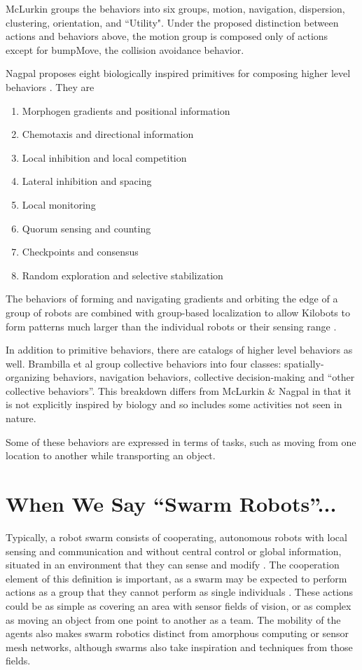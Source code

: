 \documentclass[]{article}
\begin{document}
McLurkin groups the behaviors into six groups, motion, navigation, dispersion, clustering, orientation, and ``Utility". Under the proposed distinction between actions and behaviors above, the motion group is composed only of actions except for bumpMove, the collision avoidance behavior. 

Nagpal proposes eight biologically inspired primitives for composing higher level behaviors \cite{nagpal2004catalog}. They are 
\begin{enumerate}
\item Morphogen gradients and positional information
\item Chemotaxis and directional information
\item Local inhibition and local competition
\item Lateral inhibition and spacing
\item Local monitoring
\item Quorum sensing and counting
\item Checkpoints and consensus
\item Random exploration and selective stabilization
\end{enumerate}

The behaviors of forming and navigating gradients and orbiting the edge of a group of robots are combined with group-based localization to allow Kilobots to form patterns much larger than the individual robots or their sensing range \cite{Rubenstein795}. 


In addition to primitive behaviors, there are catalogs of higher level behaviors as well. 
Brambilla et al group collective behaviors into four classes: spatially-organizing behaviors, navigation behaviors, collective decision-making and ``other collective behaviors''.
This breakdown differs from McLurkin \& Nagpal in that it is not explicitly inspired by biology and so includes some activities not seen in nature. 

Some of these behaviors are expressed in terms of tasks, such as moving from one location to another while transporting an object. 

\section{When We Say ``Swarm Robots''...}

Typically, a robot swarm consists of cooperating, autonomous robots with local sensing and communication and without central control or global information, situated in an environment that they can sense and modify \cite{brambilla2013swarm}.
The cooperation element of this definition is important, as a swarm may be expected to perform actions as a group that they cannot perform as single individuals \cite{csahin2004swarm}. 
These actions could be as simple as covering an area with sensor fields of vision, or as complex as moving an object from one point to another as a team. 
The mobility of the agents also makes swarm robotics distinct from amorphous computing or sensor mesh networks, although swarms also take inspiration and techniques from those fields.  
\end{document}
